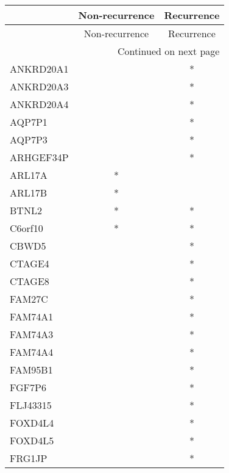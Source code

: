 \begin{longtable}{lcc}
\toprule
{} & Non-recurrence & Recurrence \\
\midrule
\endfirsthead

\toprule
{} & Non-recurrence & Recurrence \\
\midrule
\endhead
\midrule
\multicolumn{3}{r}{{Continued on next page}} \\
\midrule
\endfoot

\bottomrule
\endlastfoot
ANKRD20A1          &                &          * \\
ANKRD20A3          &                &          * \\
ANKRD20A4          &                &          * \\
AQP7P1             &                &          * \\
AQP7P3             &                &          * \\
ARHGEF34P          &                &          * \\
ARL17A             &              * &            \\
ARL17B             &              * &            \\
BTNL2              &              * &          * \\
C6orf10            &              * &          * \\
CBWD5              &                &          * \\
CTAGE4             &                &          * \\
CTAGE8             &                &          * \\
FAM27C             &                &          * \\
FAM74A1            &                &          * \\
FAM74A3            &                &          * \\
FAM74A4            &                &          * \\
FAM95B1            &                &          * \\
FGF7P6             &                &          * \\
FLJ43315           &                &          * \\
FOXD4L4            &                &          * \\
FOXD4L5            &                &          * \\
FRG1JP             &                &          * \\

\end{longtable}
